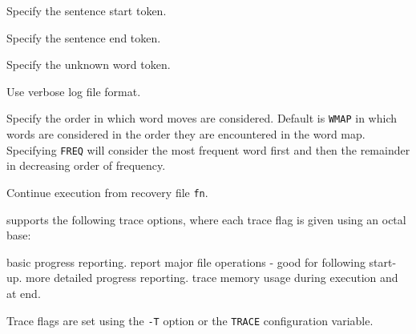 \begin{optlist}
   Specify the sentence start token.

   Specify the sentence end token.

   Specify the unknown word token.

   Use verbose log file format.

   Specify the order in which word moves are
        considered. Default is {\tt WMAP} in which words are
        considered in the order they are encountered in the word map.
        Specifying {\tt FREQ} will consider the most frequent word
        first and then the remainder in decreasing order of frequency.

   Continue execution from recovery file {\tt fn}.

\end{optlist}


 supports the following trace options, where each trace flag is 
given using an octal base:
\begin{optlist}
   basic progress reporting. 
   report major file operations - good for following start-up.
   more detailed progress reporting.
   trace memory usage during execution and at end.
\end{optlist}
Trace flags are set using the \texttt{-T} option or the \texttt{TRACE}
configuration variable.
